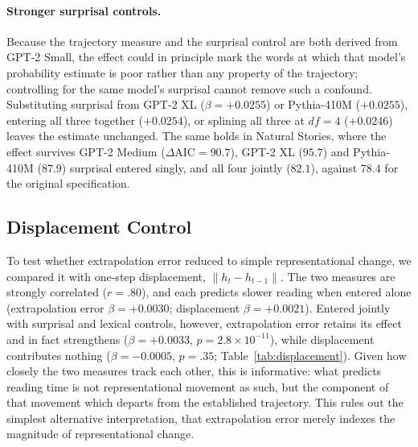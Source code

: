 \documentclass[12pt]{article}
\newcommand{\new}[1]{#1}   %
\begin{document}
{\paragraph{Stronger surprisal controls.} Because the trajectory measure and the surprisal control are both derived from GPT-2 Small, the effect could in principle mark the words at which that model's probability estimate is poor rather than any property of the trajectory; controlling for the same model's surprisal cannot remove such a confound. Substituting surprisal from GPT-2 XL ($\beta = +0.0255$) or Pythia-410M ($+0.0255$), entering all three together ($+0.0254$), or splining all three at $df = 4$ ($+0.0246$) leaves the estimate unchanged. The same holds in Natural Stories, where the effect survives GPT-2 Medium ($\Delta\text{AIC} = 90.7$), GPT-2 XL ($95.7$) and Pythia-410M ($87.9$) surprisal entered singly, and all four jointly ($82.1$), against $78.4$ for the original specification.}

\subsection{Displacement Control}

To test whether extrapolation error reduced to simple representational change, we compared it with one-step displacement, $\|h_t - h_{t-1}\|$. \new{The two measures are strongly correlated ($r = .80$), and each predicts slower reading when entered alone (extrapolation error $\beta = +0.0030$; displacement $\beta = +0.0021$). Entered jointly with surprisal and lexical controls, however, extrapolation error retains its effect and in fact strengthens ($\beta = +0.0033$, $p = 2.8 \times 10^{-11}$), while displacement contributes nothing ($\beta = -0.0005$, $p = .35$; Table~\ref{tab:displacement}). Given how closely the two measures track each other, this is informative: what predicts reading time is not representational movement as such, but the component of that movement which departs from the established trajectory. This rules out the simplest alternative interpretation, that extrapolation error merely indexes the magnitude of representational change.}
\end{document}
